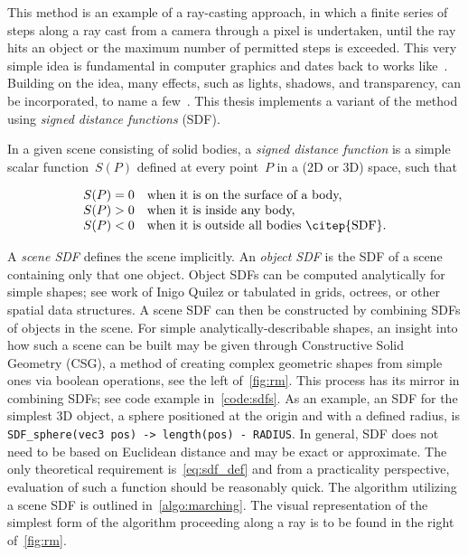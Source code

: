 This method is an example of a ray-casting approach, in which a finite series of steps along
a ray cast from a camera through a pixel is undertaken, until the ray hits an object or
the maximum number of permitted steps is exceeded. This very simple idea is fundamental in
computer graphics and dates back to works like~\citet{RayMarching, Hypertexture}. Building
on the idea, many effects, such as lights, shadows, and transparency, can be incorporated, to
name a few~\citep{RealTimeRendering}. This thesis implements a variant of the method using
\emph{signed distance functions} (SDF).

In a given scene consisting of solid bodies, a \emph{signed distance function} is a simple scalar
function~$S(P)$ defined at every point~$P$ in a (2D or 3D) space, such that

\begin{equation}\label{eq:sdf_def}
\begin{array}{ll}
S(P) = 0 & \text{when it is on the surface of a body,}\\
S(P) > 0 & \text{when it is inside any body,}\\
S(P) < 0 & \text{when it is outside all bodies~\citep{SDF}.}
\end{array}
\end{equation}

A \emph{scene SDF} defines the scene implicitly. An \emph{object SDF} is the SDF of a scene containing
only that one object. Object SDFs can be computed analytically for simple shapes; see
work of Inigo Quilez
or tabulated in grids, octrees, or other spatial data structures. A scene SDF can then be constructed
by combining SDFs of objects in the scene. For simple analytically-describable shapes, an
insight into how such a scene can be built may be given through Constructive
Solid Geometry (CSG), a method of creating complex geometric shapes from simple ones via boolean
operations, see the left of~\cref{fig:rm}. This process has its mirror in combining SDFs; see code example in~\cref{code:sdfs}.
As an example, an SDF for the simplest 3D object, a sphere positioned at the origin and with a defined radius,
is \verb|SDF_sphere(vec3 pos) -> length(pos) - RADIUS|. In general, SDF does not need to be based on Euclidean distance
and may be exact or approximate. The only theoretical requirement is~\cref{eq:sdf_def} and from a practicality perspective,
evaluation of such a function should be reasonably quick.
The algorithm utilizing a scene SDF is outlined in~\cref{algo:marching}. The visual representation of
the simplest form of the algorithm proceeding along a ray is to be found in the right of~\cref{fig:rm}.

